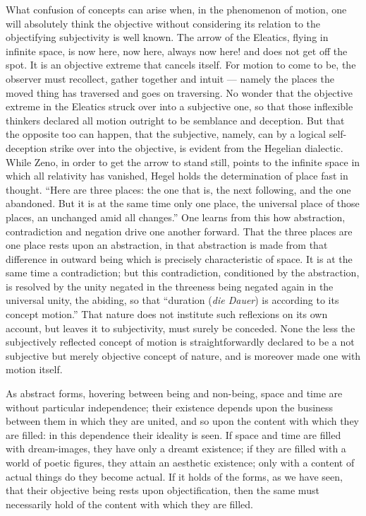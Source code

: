 \documentclass[12pt,a4paper]{book}
\begin{document}
What confusion of concepts can arise when, in the phenomenon of motion, one will
absolutely think the objective without considering its relation to the objectifying
subjectivity
is well known. The arrow of the Eleatics, flying in infinite space, is now here,
now here, always now here! and does not get off the spot. It is an objective extreme
that cancels itself. For motion to come to be, the observer must recollect, gather
together and intuit --- namely the places the moved thing has traversed and goes on
traversing. No wonder that the objective extreme in the Eleatics struck over into a
subjective one, so that those inflexible thinkers declared all motion outright to be
semblance and deception. But that the opposite too can happen, that the subjective,
namely, can by a logical self-deception strike over into the objective, is evident
from the Hegelian dialectic. While Zeno, in order to get the arrow to stand still,
points to the infinite space in which all relativity has vanished, Hegel holds the
determination of place fast in thought. ``Here are three places: the one that is,
the next following, and the one abandoned. But it is at the same time only one
place, the universal place of those places, an unchanged amid all changes.'' One
learns from this how abstraction, contradiction and negation drive one another
forward. That the three places are one place rests upon an abstraction, in that
abstraction is made from that difference in outward being which is precisely
characteristic of space. It is at the same time a contradiction; but this
contradiction, conditioned by the abstraction, is resolved by the unity negated in
the threeness being negated again in the universal unity, the abiding, so that
``duration (\textit{die Dauer}) is according to its concept motion.'' That nature does
not institute such reflexions on its own account, but leaves it to subjectivity,
must surely be conceded. None the less the subjectively reflected concept of motion
is straightforwardly declared to be a not subjective but merely objective concept of
nature, and is moreover made one with motion itself.

As abstract forms, hovering between being and non-being, space and time are without
particular independence; their existence depends upon the business between them in
which they are united,
and so upon the content with which they are filled: in this dependence their
ideality is seen. If space and time are filled with dream-images, they have only a
dreamt existence; if they are filled with a world of poetic figures, they attain an
aesthetic existence; only with a content of actual things do they become actual. If
it holds of the forms, as we have seen, that their objective being rests upon
objectification, then the same must necessarily hold of the content with which they
are filled.
\end{document}
